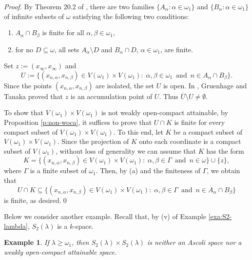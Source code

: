 \documentclass[preprint,11pt]{elsarticle}
\newtheorem{example}[theorem]{Example}
\numberwithin{equation}{section}
\numberwithin{theorem}{section}
\newcommand{\w}{\omega}
\newcommand{\SM}{{\setminus}}
\begin{document}
\begin{proof}
By Theorem 20.2 of \cite{JW-1997}, there are two families $\{ A_\alpha: \alpha\in\w_1\}$ and $\{ B_\alpha: \alpha\in\w_1\}$ of infinite subsets of $\w$ satisfying the following two conditions:
\begin{enumerate}
\item[{\rm (a)}] $A_\alpha \cap B_\beta$ is finite for all $\alpha,\beta \in\w_1$,
\item[{\rm (b)}] for no $D\subseteq \w$, all sets $A_\alpha\SM D$ and $B_\alpha\cap D$, $\alpha\in\w_1$, are finite.
\end{enumerate}

Set $z:= (x_\infty,x_\infty)$ and
\[
U:=\big\{ (x_{n,\alpha},x_{n,\beta}) \in V(\w_1)\times V(\w_1): \; \alpha,\beta \in\w_1\, \mbox{ and } \, n\in A_\alpha \cap B_\beta\big\}.
\]
Since the points $ (x_{n,\alpha},x_{n,\beta})$ are isolated, the set $U$  is open. In \cite{GT-1982}, Gruenhage and Tanaka proved that $z$ is an accumulation point of $U$. Thus $\overline{U}\SM U\not=\emptyset$.

To show that $V(\w_1)\times V(\w_1)$ is not weakly open-compact attainable, by Proposition \ref{p:non-woca}, it suffices to prove that $U\cap K$ is finite for every compact subset of  $V(\w_1)\times V(\w_1)$. To this end, let $K$ be a compact subset of $V(\w_1)\times V(\w_1)$. Since the projection of $K$ onto each coordinate is a compact subset of $V(\w_1)$, without loss of generality we can assume that $K$ has the form
\[
K=\big\{ (x_{n,\alpha},x_{n,\beta})\in V(\w_1)\times V(\w_1): \; \alpha,\beta\in \Gamma \, \mbox{ and }\, n\in\w\big\}\cup\{z\},
\]
where $\Gamma$ is a finite subset of $\w_1$. Then, by (a) and the finiteness of $\Gamma$, we obtain that
\[
U \cap K\subseteq \big\{ (x_{n,\alpha},x_{n,\beta})\in V(\w_1)\times V(\w_1): \; \alpha,\beta\in \Gamma \, \mbox{ and } \, n\in A_\alpha \cap B_\beta\big\}
\]
is finite, as desired.\qed
\end{proof}

Below we consider another example. Recall that, by  (v) of Example \ref{exa:S2-lambda}, $S_2(\lambda)$ is a $k$-space.


\begin{example} \label{exa:S2-lambda-prod}
If $\lambda\geq\w_1$, then  $S_2(\lambda)\times S_2(\lambda)$  is neither an Ascoli space nor  a weakly open-compact attainable space.
\end{example}
\end{document}
